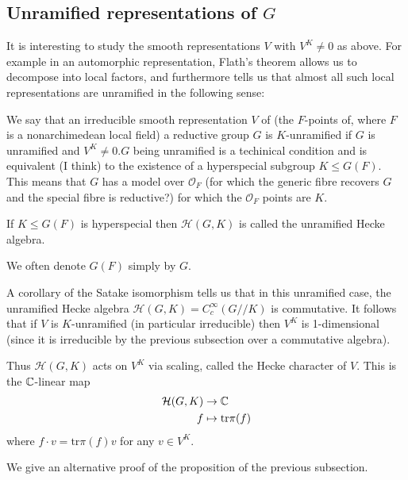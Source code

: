 \subsection{Unramified representations of $G$}


It is interesting to study the smooth representations $V$ with $V^K \neq 0$ as above. For example in an automorphic representation, Flath's theorem allows us to decompose into local factors, and furthermore tells us that almost all such local representations are unramified in the following sense:

\begin{defn}
    We say that an irreducible smooth representation $V$ of (the $F$-points of, where $F$ is a nonarchimedean local field) a reductive group $G$ is $K$-unramified if $G$ is unramified and $V^K \neq 0$.$G$ being unramified is a techinical condition and is equivalent (I think) to the existence of a hyperspecial subgroup $K \leq G(F)$. This means that $G$ has a model over $\mathcal O_F$ (for which the generic fibre recovers $G$ and the special fibre is reductive?) for which the $\mathcal O_F$ points are $K$.
\end{defn}
\begin{defn}
    If $K \leq G(F)$ is hyperspecial then $\mathcal H(G,K)$ is called the unramified Hecke algebra.
\end{defn}
We often denote $G(F)$ simply by $G$.

A corollary of the Satake isomorphism tells us that in this unramified case, the unramified Hecke algebra $\mathcal H(G,K)=C_c^\infty(G//K)$ is commutative. It follows that if $V$ is $K$-unramified (in particular irreducible) then $V^K$ is 1-dimensional (since it is irreducible by the previous subsection over a commutative algebra).

\begin{defn}
    Thus $\mathcal H(G,K)$ acts on $V^K$ via scaling, called the Hecke character of $V$. This is the $\mathbb{C}$-linear map
    \begin{equation*}
        \begin{split}
            \mathcal H(G,K) &\to \mathbb{C} \\
            f &\mapsto \mathrm{tr} \pi(f)
        \end{split}
    \end{equation*}
    where $f \cdot v = \mathrm{tr}\pi(f) v $ for any $v \in V^K$.
\end{defn}

We give an alternative proof of the proposition of the previous subsection.

